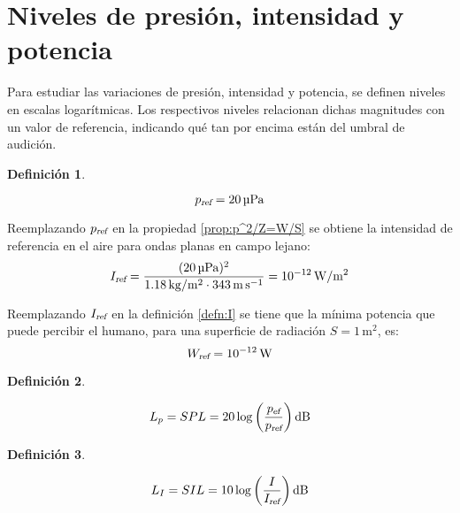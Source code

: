 \documentclass[a5paper,12pt,twoside]{book}
\newtheorem{defn}{{Definición}}[chapter]
\begin{document}
\section{Niveles de presión, intensidad y potencia}

Para estudiar las variaciones de presión, intensidad y potencia, se definen niveles en escalas logarítmicas.
Los respectivos niveles relacionan dichas magnitudes con un valor de referencia, indicando qué tan por encima están del umbral de audición.

\begin{mdframed}[style=MyFrame1]
    \begin{defn}
    \end{defn}
    \begin{equation*}
        {{p}_\textsl{{ref}}} = 20\,\si{\micro\pascal}
    \end{equation*}
\end{mdframed}

Reemplazando ${{p}_\textsl{{ref}}}$ en la propiedad \ref{prop:p^2/Z=W/S} se obtiene la intensidad de referencia en el aire para ondas planas en campo lejano:
\begin{equation*}
    {{I}_\textsl{{ref}}}=\frac{(20\,\si{\micro\pascal})^2}{1.18\,\si{\kilo\gram\per\metre^2} \cdot 343\,\si{\metre\per\second}} = 10^{-12}\,\si{\watt\per\metre^2}
\end{equation*}

Reemplazando ${{I}_\textsl{{ref}}}$ en la definición \ref{defn:I} se tiene que la mínima potencia que puede percibir el humano, para una superficie de radiación $S=1\,\si{\metre^2}$, es:
\begin{equation*}
    {{W}_\textsl{{ref}}} = 10^{-12}\,\si{\watt}
\end{equation*}

\begin{mdframed}[style=MyFrame1]
    \begin{defn}
        \label{defn:SPL}
    \end{defn}
    \begin{equation*}
        L_p = SPL = 20 \log \left( \frac{\rms{p}}{\sub{p}{ref}} \right) \si{\deci\bel}
    \end{equation*}
\end{mdframed}

\begin{mdframed}[style=MyFrame1]
    \begin{defn}
        \label{defn:SIL}
    \end{defn}
    \begin{equation*}
        L_I = SIL = 10 \log \left( \frac{I}{\sub{I}{ref}} \right)\si{\deci\bel}
    \end{equation*}
\end{mdframed}
\end{document}
